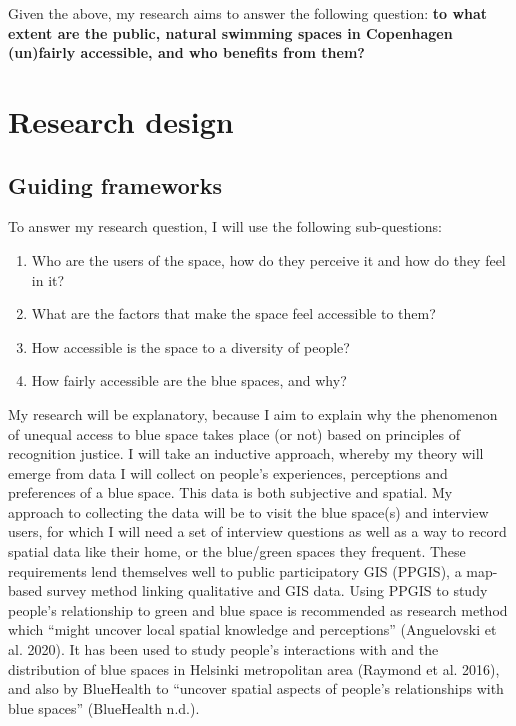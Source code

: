 \documentclass{article}
\begin{document}
Given the above, my research aims to answer the following question: \textbf{to what extent are the public, natural swimming spaces in Copenhagen (un)fairly accessible, and who benefits from them?}


\section{Research design}

\subsection{Guiding frameworks}

To answer my research question, I will use the following sub-questions:

\begin{enumerate}
	\item Who are the users of the space, how do they perceive it and how do they feel in it?
	\item What are the factors that make the space feel accessible to them?
	\item How accessible is the space to a diversity of people?
	\item How fairly accessible are the blue spaces, and why?
\end{enumerate}

My research will be explanatory, because I aim to explain why the phenomenon of unequal access to blue space takes place (or not) based on principles of recognition justice. I will take an inductive approach, whereby my theory will emerge from data I will collect on people’s experiences, perceptions and preferences of a blue space. This data is both subjective and spatial. My approach to collecting the data will be to visit the blue space(s) and interview users, for which I will need a set of interview questions as well as a way to record spatial data like their home, or the blue/green spaces they frequent. These requirements lend themselves well to public participatory GIS (PPGIS), a map-based survey method linking qualitative and GIS data. Using PPGIS to study people’s relationship to green and blue space is recommended as research method which “might uncover local spatial knowledge and perceptions” (Anguelovski et al. 2020). It has been used to study people’s interactions with and the distribution of blue spaces in Helsinki metropolitan area (Raymond et al. 2016), and also by BlueHealth to “uncover spatial aspects of people’s relationships with blue spaces” (BlueHealth n.d.).
\end{document}
